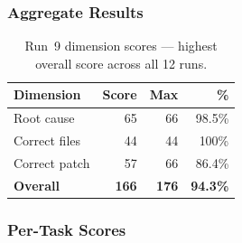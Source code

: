 \subsubsection{Aggregate Results}

\begin{table}[h]
\centering
\caption{Run~9 dimension scores --- highest overall score across all 12 runs.}\label{tab:r9-dim}
\begin{tabular}{lrrr}
\toprule
\textbf{Dimension} & \textbf{Score} & \textbf{Max} & \textbf{\%} \\
\midrule
Root cause         & 65 & 66 & 98.5\% \\
Correct files      & 44 & 44 & 100\%  \\
Correct patch      & 57 & 66 & 86.4\% \\
\midrule
\textbf{Overall}   & \textbf{166} & \textbf{176} & \textbf{94.3\%} \\
\bottomrule
\end{tabular}
\end{table}

\subsubsection{Per-Task Scores}

